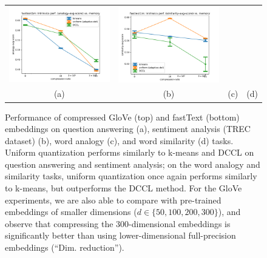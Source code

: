 \begin{figure}
\begin{tabular}{@{\hskip -0.0in}c@{\hskip -0.0in}c@{\hskip -0.0in}c@{\hskip -0.0in}c@{\hskip -0.0in}}
		\includegraphics[width=.245\linewidth]{figures/fasttext1m_intrinsics_analogy-avg-score_vs_compression.pdf} &
		\includegraphics[width=.245\linewidth]{figures/fasttext1m_intrinsics_similarity-avg-score_vs_compression.pdf} \\
		\;\;\;\;\;(a) & \;\;\;\;\;\;(b) & \;\;\;\;\;\;(c) & \;\;\;\;\;\;(d)
	\end{tabular}
\caption{Performance of compressed GloVe (top) and fastText (bottom) embeddings on question answering (a), sentiment analysis (TREC dataset) (b), word analogy (c), and word similarity (d) tasks.
Uniform quantization performs similarly to k-means and DCCL on question answering and sentiment analysis;
on the word analogy and similarity tasks, uniform quantization once again performs similarly to k-means, but outperforms the DCCL method.
For the GloVe experiments, we are also able to compare with pre-trained embeddings of smaller dimensions ($d\in\{50,100,200,300\}$), and observe that compressing the 300-dimensional embeddings is significantly better than using lower-dimensional full-precision embeddings (``Dim. reduction'').
}
	\label{fig:perf_comp}
\end{figure}


